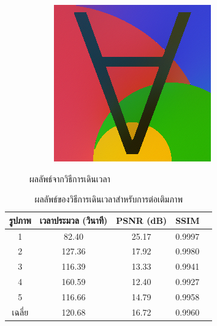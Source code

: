 \documentclass[hidelinks, a4paper,12pt]{article}
\numberwithin{equation}{section}							%
\numberwithin{equation}{section}
\begin{document}
{\begin{figure}[H]
\begin{subfigure}{0.4\linewidth}
			\includegraphics[width=0.8\linewidth]{images/result_ex1/timemarch05.png}			
		\end{subfigure}
		\caption{ผลลัพธ์จากวิธีการเดินเวลา}
	\end{figure}
\begin{table}[H]
	\centering
	\begin{tabular}[ht]{|c|c|c|c|c|}
		\hline
		รูปภาพ &เวลาประมวล  (วินาที) & PSNR (dB) & SSIM \\
		\hline
		1 & 82.40 & 25.17 & 0.9997 \\ 
		2 & 127.36 & 17.92 & 0.9980 \\
		3 &  116.39 & 13.33 & 0.9941 \\
		4 & 160.59  &12.40  & 0.9927 \\
		5 & 116.66  & 14.79  & 0.9958 \\
		\hline
		เฉลี่ย & 120.68  & 16.72  & 0.9960 \\
		\hline
	\end{tabular}
	\caption{ผลลัพธ์ของวิธีการเดินเวลาสำหรับการต่อเติมภาพ}
\end{table}	
\begin{figure}[H]
	\centering
	\begin{subfigure}{0.4\linewidth}
		\centering

\end{subfigure}
\end{figure}}
\end{document}
